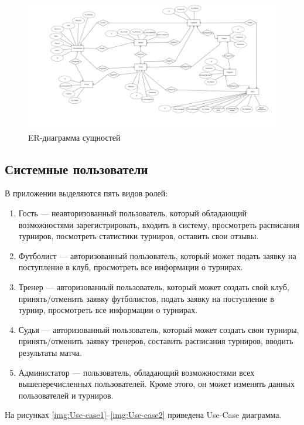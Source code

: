 \begin{figure}[h]
	\centering
	\includegraphics[height=0.3\textheight]{img/ER.png}
	\caption{ER-диаграмма сущностей}
	\label{img:ER}
\end{figure}
\subsection{Системные пользователи}

В приложении выделяются пять видов ролей:
\begin{enumerate}
	\item Гость --- неавторизованный пользователь, который обладающий возможностями зарегистрировать, входить в систему, просмотреть расписания турниров, посмотреть  статистики турниров, оставить свои отзывы.
	\item Футболист --- авторизованный пользователь, который может подать заявку на поступление в клуб, просмотреть все информации о турнирах.
	\item Тренер --- авторизованный пользователь, который может создать свой клуб, принять/отменить заявку футболистов, подать заявку на поступление в турнир, просмотреть все информации о турнирах.
	\item Судья --- авторизованный пользователь, который может создать свои турниры, принять/отменить заявку тренеров, составить расписания турниров, вводить результаты матча.
	\item Администатор --- пользователь, обладающий возможностями всех вышеперечисленных пользователей. Кроме этого, он может изменять данных пользователей и турниров.
\end{enumerate}

На рисунках \ref{img:Use-case1}--\ref{img:Use-case2} приведена Use-Case диаграмма.

